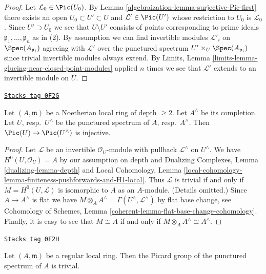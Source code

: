 \begin{proof}

Let $\mathcal{L}_0 \in \Pic(U_0)$. By
Lemma \ref{algebraization-lemma-surjective-Pic-first}
there exists an open $U_0 \subset U' \subset U$
and $\mathcal{L}' \in \Pic(U')$ whose restriction
to $U_0$ is $\mathcal{L}_0$.
Since $U' \supset U_0$ we see that $U \setminus U'$
consists of points corresponding to prime ideals
$\mathfrak p_1, \ldots, \mathfrak p_n$ as in (2).
By assumption we can find invertible modules
$\mathcal{L}'_i$ on $\Spec(A_{\mathfrak p_i})$ agreeing with
$\mathcal{L}'$ over the punctured spectrum
$U' \times_U \Spec(A_{\mathfrak p_i})$ since
trivial invertible modules always extend.
By Limits, Lemma \ref{limits-lemma-glueing-near-closed-point-modules}
applied $n$ times we see that $\mathcal{L}'$ extends to an
invertible module on $U$.
\end{proof}

\begin{lemma}
\label{algebraization-lemma-local-pic-to-completion}
\href{https://stacks.math.columbia.edu/tag/0F2G}{\texttt{Stacks tag 0F2G}}

Let $(A, \mathfrak m)$ be a Noetherian local ring of depth $\geq 2$.
Let $A^\wedge$ be its completion. Let $U$, resp.\ $U^\wedge$
be the punctured spectrum of $A$, resp.\ $A^\wedge$. Then
$\Pic(U) \to \Pic(U^\wedge)$ is injective.
\end{lemma}

\begin{proof}
Let $\mathcal{L}$ be an invertible $\mathcal{O}_U$-module
with pullback $\mathcal{L}^\wedge$ on $U^\wedge$.
We have $H^0(U, \mathcal{O}_U) = A$ by our assumption on depth and
Dualizing Complexes, Lemma \ref{dualizing-lemma-depth} and
Local Cohomology, Lemma
\ref{local-cohomology-lemma-finiteness-pushforwards-and-H1-local}.
Thus $\mathcal{L}$ is trivial if and only if
$M = H^0(U, \mathcal{L})$ is isomorphic to $A$ as an $A$-module.
(Details omitted.) Since $A \to A^\wedge$ is flat
we have $M \otimes_A A^\wedge = \Gamma(U^\wedge, \mathcal{L}^\wedge)$
by flat base change, see
Cohomology of Schemes, Lemma \ref{coherent-lemma-flat-base-change-cohomology}.
Finally, it is easy to see that $M \cong A$ if and only if
$M \otimes_A A^\wedge \cong A^\wedge$.
\end{proof}

\begin{lemma}
\label{algebraization-lemma-trivial-local-pic-regular}
\href{https://stacks.math.columbia.edu/tag/0F2H}{\texttt{Stacks tag 0F2H}}

Let $(A, \mathfrak m)$ be a regular local ring. Then the Picard
group of the punctured spectrum of $A$ is trivial.
\end{lemma}

